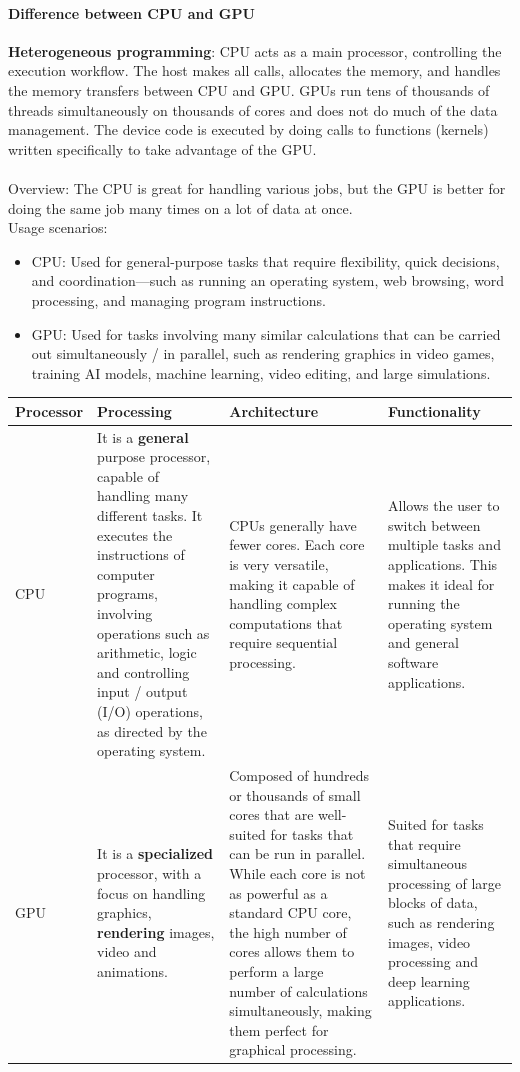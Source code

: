 \paragraph{Difference between CPU and GPU}
\textbf{Heterogeneous programming}: CPU acts as a main processor, controlling the execution workflow. The host makes all calls, allocates the memory, and handles the memory transfers between CPU and GPU. GPUs run tens of thousands of threads simultaneously on thousands of cores and does not do much of the data management. The device code is executed by doing calls to functions (kernels) written specifically to take advantage of the GPU. \\\\
Overview: The CPU is great for handling various jobs, but the GPU is better for doing the same job many times on a lot of data at once.\\
Usage scenarios:
\begin{itemize}
\item  CPU: Used for general-purpose tasks that require flexibility, quick decisions, and
coordination—such as running an operating system, web browsing, word processing, and managing program instructions.
\item  GPU: Used for tasks involving many similar calculations that can be carried out simultaneously / in parallel, such as rendering graphics in video games, training AI models, machine learning, video editing, and large simulations.
\end{itemize}
\begin{center}
    \begin{tabular}{|p{2.2cm}|p{4.5cm}|p{6.5cm}|p{4.5cm}|}
\hline
\textbf{Processor} & \textbf{Processing} & \textbf{Architecture} & \textbf{Functionality} \\
\hline
CPU & It is a \textbf{general} purpose processor, capable of handling many different tasks. It executes the instructions of computer programs, involving operations such as arithmetic, logic and controlling input / output (I/O) operations, as directed by the operating system. & CPUs generally have fewer cores. Each core is very versatile, making it capable of handling complex computations that require sequential processing. & Allows the user to switch between multiple tasks and applications. This makes it ideal for running the operating system and general software applications. \\
\hline
GPU & It is a \textbf{specialized} processor, with a focus on handling graphics, \textbf{rendering} images, video and animations. & Composed of hundreds or thousands of small cores that are well-suited for tasks that can be run in parallel. While each core is not as powerful as a standard CPU core, the high number of cores allows them to perform a large number of calculations simultaneously, making them perfect for graphical processing. & Suited for tasks that require simultaneous processing of large blocks of data, such as rendering images, video processing and deep learning applications. \\
\hline
\end{tabular}
\end{center}
